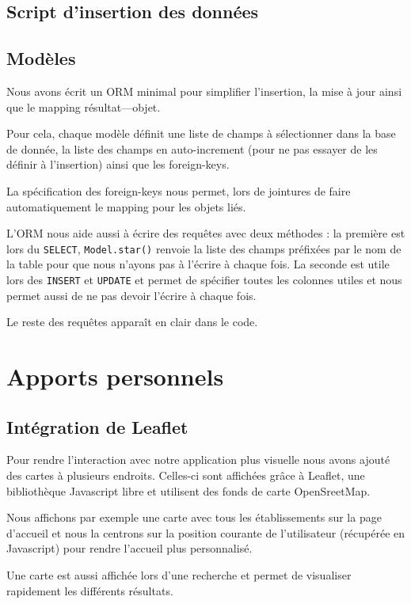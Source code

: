 \documentclass[10pt,a4paper]{article}
\begin{document}
\subsection{Script d'insertion des données}

\subsection{Modèles}

Nous avons écrit un ORM minimal pour simplifier l'insertion, la mise à jour ainsi que le mapping résultat---objet.

Pour cela, chaque modèle définit une liste de champs à sélectionner dans la base de donnée, la liste des champs en auto-increment (pour ne pas essayer de les définir à l'insertion) ainsi que les foreign-keys.

La spécification des foreign-keys nous permet, lors de jointures de faire automatiquement le mapping pour les objets liés.

L'ORM nous aide aussi à écrire des requêtes avec deux méthodes : la première est lors du \texttt{SELECT}, \texttt{Model.star()} renvoie la liste des champs préfixées par le nom de la table pour que nous n'ayons pas à l'écrire à chaque fois. La seconde est utile lors des \texttt{INSERT} et \texttt{UPDATE} et permet de spécifier toutes les colonnes utiles et nous permet aussi de ne pas devoir l'écrire à chaque fois.

Le reste des requêtes apparaît en clair dans le code.

\section{Apports personnels}

\subsection{Intégration de Leaflet}

Pour rendre l’interaction avec notre application plus visuelle nous avons ajouté des cartes à plusieurs endroits. Celles-ci sont affichées grâce à Leaflet, une bibliothèque Javascript libre et utilisent des fonds de carte OpenSreetMap.

Nous affichons par exemple une carte avec tous les établissements sur la page d'accueil et nous la centrons sur la position courante de l'utilisateur (récupérée en Javascript) pour rendre l'accueil plus personnalisé.

Une carte est aussi affichée lors d'une recherche et permet de visualiser rapidement les différents résultats.
\end{document}
